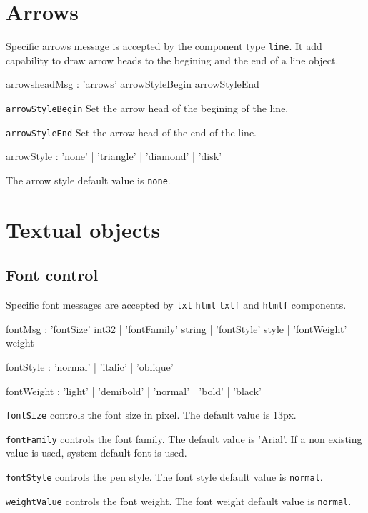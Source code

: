 \documentclass[a4paper,twoside]{report}
\newcommand{\sublevel}[1]	{\section{#1}}
\newcommand{\subsublevel}[1]	{\subsection{#1}}
\newcommand{\OSC}[1]		{\texttt{#1}}
\let\olditemize\itemize
\let\oldenditemize\enditemize
\renewenvironment{itemize} 	{\olditemize \setlength{\itemsep}{1mm}}{\oldenditemize}
\begin{document}
\sublevel{Arrows}
\label{arrows}

Specific arrows message is accepted by the component type \OSC{line}. It add capability to draw arrow heads to the begining and the end of a line object.
\begin{rail}
arrowsheadMsg : 'arrows' arrowStyleBegin arrowStyleEnd 
\end{rail}

\begin{itemize}
\item \OSC{arrowStyleBegin} Set the arrow head of the begining of the line.
\item \OSC{arrowStyleEnd} Set the arrow head of the end of the line.
\end{itemize}
\begin{rail}
arrowStyle : 'none' | 'triangle' | 'diamond' | 'disk'
\end{rail}
The arrow style default value is \OSC{none}.

\sublevel{Textual objects}
\subsublevel{Font control}
\label{fontctrl}
Specific font messages are accepted by \OSC{txt} \OSC{html} \OSC{txtf} and  \OSC{htmlf} components.
\begin{rail}
fontMsg : 	  'fontSize' int32 
			| 'fontFamily' string
			| 'fontStyle' style
			| 'fontWeight' weight
\end{rail}

\begin{rail}
	fontStyle : 'normal' | 'italic' | 'oblique'
\end{rail}

\begin{rail}
	fontWeight : 'light' | 'demibold' | 'normal' | 'bold' | 'black'
\end{rail}

\begin{itemize}
\item \OSC{fontSize} controls the font size in pixel. The default value is 13px.
\item \OSC{fontFamily} controls the font family. The default value is 'Arial'. If a non existing value is used, system default font is used.
\item \OSC{fontStyle} controls the pen style. The font style default value is \OSC{normal}.\\
\item \OSC{weightValue} controls the font weight. The font weight default value is \OSC{normal}.
\end{itemize}
\end{document}
